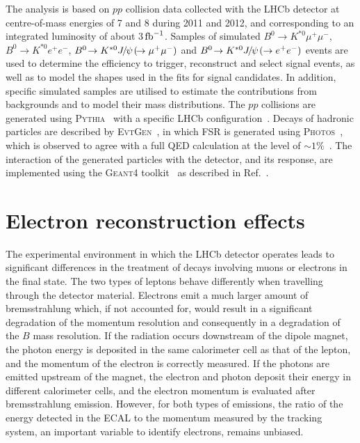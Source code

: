 \documentclass[12pt,a4paper]{article}
\def\lhcb {\mbox{LHCb}\xspace}
\def\Pmu         {\ensuremath{\upmu}\xspace}
\def\Ppsi        {\ensuremath{\uppsi}\xspace}
\def\PB      {\ensuremath{\mathrm{B}}\xspace}
\def\PJ      {\ensuremath{\mathrm{J}}\xspace}
\def\PK      {\ensuremath{\mathrm{K}}\xspace}
\def\Pe      {\ensuremath{\mathrm{e}}\xspace}
\def\Pp      {\ensuremath{\mathrm{p}}\xspace}
\def\Pmu         {\ensuremath{\mu}\xspace}
\def\Ppsi        {\ensuremath{\psi}\xspace}
\def\PB      {\ensuremath{B}\xspace}
\def\PJ      {\ensuremath{J}\xspace}
\def\PK      {\ensuremath{K}\xspace}
\def\Pe      {\ensuremath{e}\xspace}
\def\Pp      {\ensuremath{p}\xspace}
\def\epem       {\ensuremath{\Pe^+\Pe^-}\xspace}
\def\mup        {\ensuremath{\Pmu^+}\xspace}
\def\mun        {\ensuremath{\Pmu^-}\xspace} \def\mumu       {\ensuremath{\Pmu^+\Pmu^-}\xspace}
\def\kaon  {\ensuremath{\PK}\xspace}
\def\Kstarz  {\ensuremath{\kaon^{*0}}\xspace}
\def\B       {\ensuremath{\PB}\xspace}
\def\Bd      {\ensuremath{\B^0}\xspace}
\def\jpsi     {\ensuremath{{\PJ\mskip -3mu/\mskip -2mu\Ppsi\mskip 2mu}}\xspace}
\def\proton      {\ensuremath{\Pp}\xspace}
\newcommand{\decay}[2]{\ensuremath{#1\!\to #2}\xspace}         \def\ra                 {\ensuremath{\rightarrow}\xspace}
\def\to                 {\ensuremath{\rightarrow}\xspace}
\def\BdToKstmm    {\decay{\Bd}{\Kstarz\mup\mun}}
\newcommand{\tev}{\ifthenelse{\boolean{inbibliography}}{\ensuremath{~T\kern -0.05em eV}\xspace}{\ensuremath{\mathrm{\,Te\kern -0.1em V}}\xspace}}
\def\invfb   {\ensuremath{\mbox{\,fb}^{-1}}\xspace}
\def\evtgen     {\mbox{\textsc{EvtGen}}\xspace}
\def\geant      {\mbox{\textsc{Geant4}}\xspace}
\def\photos     {\mbox{\textsc{Photos}}\xspace}
\def\pythia     {\mbox{\textsc{Pythia}}\xspace}
\def\pp{\ensuremath{\proton\proton}\xspace}
\def\BdToKstmm{\mbox{\decay{\Bd}{\Kstarz \mumu}}\xspace}
\def\BdToKstee{\mbox{\decay{\Bd}{\Kstarz \epem}}\xspace}
\def\BdToKstJPsmm{\mbox{\decay{\Bd}{\Kstarz \jpsi(\decay{}{\mumu})}}\xspace}
\def\BdToKstJPsee{\mbox{\decay{\Bd}{\Kstarz \jpsi(\to\epem)}}\xspace}
\begin{document}
The analysis is based on \pp collision data collected with the \lhcb detector at centre-of-mass energies of 7 and 8 \tev during 2011 and 2012,  and corresponding to an integrated luminosity of about 3\invfb.
Samples of simulated \BdToKstmm, \BdToKstee, \BdToKstJPsmm and \BdToKstJPsee events are used to determine the efficiency to trigger, reconstruct and select signal events, as well as to model the shapes used in the fits for signal candidates.
In addition, specific simulated samples are utilised to estimate the contributions from backgrounds and to model their mass distributions. 
The \pp collisions are generated using \pythia~\cite{Sjostrand:2006za,*Sjostrand:2007gs} with a specific \lhcb configuration~\cite{LHCb-PROC-2010-056}.
Decays of hadronic particles are described by \evtgen~\cite{Lange:2001uf}, in which FSR is generated using \photos~\cite{Golonka:2005pn}, which is observed to agree with a full QED calculation at the level of $\sim1\%$~\cite{Bordone:2016gaq}.
The interaction of the generated particles with the detector, and its response, are implemented using the \geant toolkit~\cite{Allison:2006ve, *Agostinelli:2002hh} as described in Ref.~\cite{LHCb-PROC-2011-006}.
 

\section{Electron reconstruction effects}
\label{sec:eleRecoEff}

The experimental environment in which the \lhcb detector operates leads to significant differences in the treatment of decays involving muons or electrons in the final state.
The two types of leptons behave differently when travelling through the detector material. 
Electrons emit a much larger amount of bremsstrahlung which, if not accounted for, would result in a significant degradation of the momentum resolution and consequently in a degradation of the \B mass resolution.
If the radiation occurs downstream of the dipole magnet, the photon energy is deposited in the same calorimeter cell as that of the lepton, and the momentum of the electron is correctly measured.
If the photons are emitted upstream of the magnet, the electron and photon deposit their energy in different calorimeter cells, and the electron momentum is evaluated after bremsstrahlung emission.
However, for both types of emissions, the ratio of the energy detected in the ECAL to the momentum measured by the tracking system, an important variable to identify electrons, remains unbiased.
\end{document}
